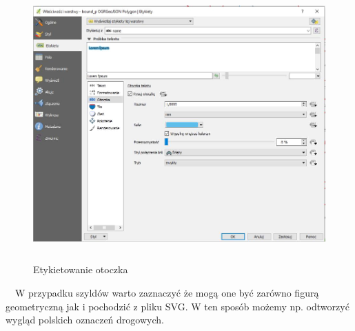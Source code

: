 \documentclass[12pt,a4paper]{book}
\begin{document}
\begin{center}
\begin{figure}
\includegraphics[width=13cm,height=10.499cm]{007-etykiety-otoczka.png}
\caption{Etykietowanie otoczka}
\end{figure}
\end{center}
\ \ W przypadku szyldów warto zaznaczyć że mogą one być zarówno figurą geometryczną jak i pochodzić z pliku SVG. W ten sposób możemy np. odtworzyć wygląd polskich oznaczeń drogowych.
\end{document}
